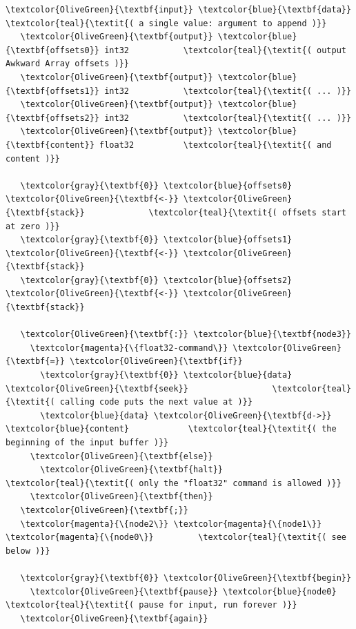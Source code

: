 \documentclass{webofc}
\begin{document}
\small
\begin{Verbatim}[commandchars=\\\{\}]
   \textcolor{OliveGreen}{\textbf{input}} \textcolor{blue}{\textbf{data}}                      \textcolor{teal}{\textit{( a single value: argument to append )}}
   \textcolor{OliveGreen}{\textbf{output}} \textcolor{blue}{\textbf{offsets0}} int32           \textcolor{teal}{\textit{( output Awkward Array offsets )}}
   \textcolor{OliveGreen}{\textbf{output}} \textcolor{blue}{\textbf{offsets1}} int32           \textcolor{teal}{\textit{( ... )}}
   \textcolor{OliveGreen}{\textbf{output}} \textcolor{blue}{\textbf{offsets2}} int32           \textcolor{teal}{\textit{( ... )}}
   \textcolor{OliveGreen}{\textbf{output}} \textcolor{blue}{\textbf{content}} float32          \textcolor{teal}{\textit{( and content )}}

   \textcolor{gray}{\textbf{0}} \textcolor{blue}{offsets0} \textcolor{OliveGreen}{\textbf{<-}} \textcolor{OliveGreen}{\textbf{stack}}             \textcolor{teal}{\textit{( offsets start at zero )}}
   \textcolor{gray}{\textbf{0}} \textcolor{blue}{offsets1} \textcolor{OliveGreen}{\textbf{<-}} \textcolor{OliveGreen}{\textbf{stack}}
   \textcolor{gray}{\textbf{0}} \textcolor{blue}{offsets2} \textcolor{OliveGreen}{\textbf{<-}} \textcolor{OliveGreen}{\textbf{stack}}

   \textcolor{OliveGreen}{\textbf{:}} \textcolor{blue}{\textbf{node3}}
     \textcolor{magenta}{\{float32-command\}} \textcolor{OliveGreen}{\textbf{=}} \textcolor{OliveGreen}{\textbf{if}}
       \textcolor{gray}{\textbf{0}} \textcolor{blue}{data} \textcolor{OliveGreen}{\textbf{seek}}                 \textcolor{teal}{\textit{( calling code puts the next value at )}}
       \textcolor{blue}{data} \textcolor{OliveGreen}{\textbf{d->}} \textcolor{blue}{content}            \textcolor{teal}{\textit{( the beginning of the input buffer )}}
     \textcolor{OliveGreen}{\textbf{else}}
       \textcolor{OliveGreen}{\textbf{halt}}                        \textcolor{teal}{\textit{( only the "float32" command is allowed )}}
     \textcolor{OliveGreen}{\textbf{then}}
   \textcolor{OliveGreen}{\textbf{;}}
   \textcolor{magenta}{\{node2\}} \textcolor{magenta}{\{node1\}} \textcolor{magenta}{\{node0\}}         \textcolor{teal}{\textit{( see below )}}

   \textcolor{gray}{\textbf{0}} \textcolor{OliveGreen}{\textbf{begin}}
     \textcolor{OliveGreen}{\textbf{pause}} \textcolor{blue}{node0}                   \textcolor{teal}{\textit{( pause for input, run forever )}}
   \textcolor{OliveGreen}{\textbf{again}}
\end{Verbatim}
\normalsize
\end{document}
